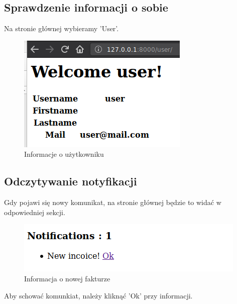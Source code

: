 \documentclass[12pt]{article}
\begin{document}
	\subsection{Sprawdzenie informacji o sobie}
	Na stronie głównej wybieramy 'User'.
	\begin{figure}[H]
		\centering
		\includegraphics[scale=0.7]{img/5.png}
		\caption{Informacje o użytkowniku}
	\end{figure}
	\subsection{Odczytywanie notyfikacji}
	Gdy pojawi się nowy komunikat, na stronie głównej będzie to widać w odpowiedniej sekcji.
	\begin{figure}[H]
		\centering
		\includegraphics[scale=0.7]{img/9.png}
		\caption{Informacja o nowej fakturze}
	\end{figure}
	Aby schować komunkiat, należy kliknąć 'Ok' przy informacji.
\end{document}
